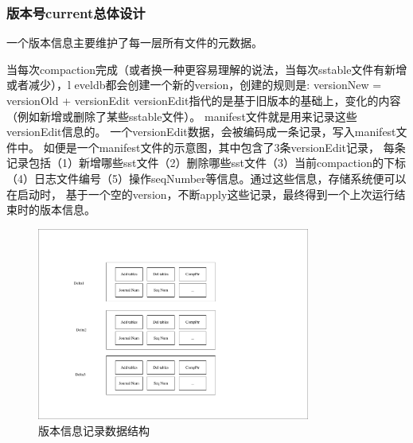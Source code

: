 		\subsubsection{版本号current总体设计}

		一个版本信息主要维护了每一层所有文件的元数据。

		当每次compaction完成（或者换一种更容易理解的说法，当每次sstable文件有新增或者减少），l
		eveldb都会创建一个新的version，创建的规则是: versionNew = versionOld + versionEdit
		versionEdit指代的是基于旧版本的基础上，变化的内容（例如新增或删除了某些sstable文件）。
		manifest文件就是用来记录这些versionEdit信息的。
		一个versionEdit数据，会被编码成一条记录，写入manifest文件中。
		如便是一个manifest文件的示意图，其中包含了3条versionEdit记录，
		每条记录包括（1）新增哪些sst文件（2）删除哪些sst文件（3）当前compaction的下标
		（4）日志文件编号（5）操作seqNumber等信息。通过这些信息，存储系统便可以在启动时，
		基于一个空的version，不断apply这些记录，最终得到一个上次运行结束时的版本信息。

		\begin{figure}[H]
			\centering
			\includegraphics[width=0.80\textwidth]{pdf/manifest.pdf}
			\caption{版本信息记录数据结构}
			\label{radds_storage_manifest}
		\end{figure}

	
	
